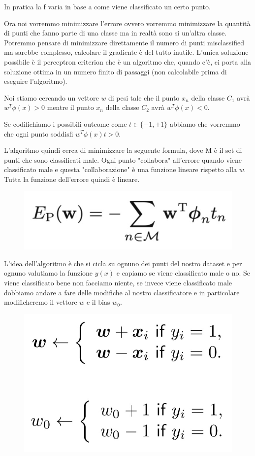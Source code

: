 \documentclass[14pt]{extreport}
\begin{document}
In pratica la f varia in base a come viene classificato un certo punto.

Ora noi vorremmo minimizzare l'errore ovvero vorremmo minimizzare la quantità di punti che fanno parte di una classe ma in realtà sono si un'altra
classe. Potremmo pensare di minimizzare direttamente il numero di punti misclassified ma sarebbe complesso, calcolare il gradiente è del tutto
inutile. L'unica soluzione possibile è il perceptron criterion che è un algoritmo che, quando c'è, ci porta alla soluzione ottima in un numero finito
di passaggi (non calcolabile prima di eseguire l'algoritmo).

Noi stiamo cercando un vettore $w$ di pesi tale che il punto $x_n$ della classe $C_1$ avrà $w^T\phi(x) > 0$ mentre il punto $x_n$ della classe $C_2$
avrà $w^T\phi(x)<0$.

Se codifichiamo i possibili outcome come $t \in \{-1, +1\}$ abbiamo che vorremmo che ogni punto soddisfi $w^T\phi(x)t > 0$.

L'algoritmo quindi cerca di minimizzare la seguente formula, dove M è il set di punti che sono classificati male. Ogni punto "collabora" all'errore
quando viene classificato male e questa "collaborazione" è una funzione lineare rispetto alla $w$. Tutta la funzione dell'errore quindi è lineare.

\begin{figure}[H]
	\centering
	\includegraphics[width=0.7\linewidth]{197.jpeg}
\end{figure}

L'idea dell'algoritmo è che si cicla su ognuno dei punti del nostro dataset e per ognuno valutiamo la funzione $y(x)$ e capiamo se viene classificato
male o no. Se viene classificato bene non facciamo niente, se invece viene classificato male dobbiamo andare a fare delle modifiche al nostro
classificatore e in particolare modificheremo il vettore $w$ e il bias $w_0$.


\begin{figure}[H]
	\centering
	\includegraphics[width=0.4\linewidth]{151.jpeg}
\end{figure}
\end{document}
